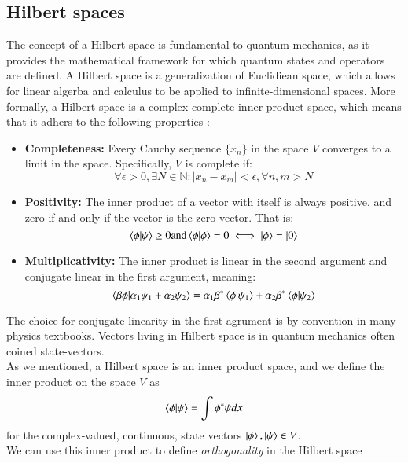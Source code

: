 \documentclass{subfiles}
\begin{document}
\subsection{Hilbert spaces}\label{sec:Hilbert_space}
The concept of a Hilbert space is fundamental to quantum mechanics, as it provides the mathematical framework for which quantum states and operators are defined. A Hilbert space is a generalization of Euclidiean space, which allows for linear algerba and calculus to be applied to infinite-dimensional spaces. More formally, a Hilbert space is a complex complete inner product space, which means that it adhers to the following properties \cite{griffiths2018introduction, berera2021quantum}: 
\begin{itemize}
    \item \textbf{Completeness:} Every Cauchy sequence $\{x_n\}$ in the space $V$ converges to a limit in the space. Specifically, $V$ is complete if:
    \begin{equation}
        \forall \epsilon > 0, \exists N \in \mathbb{N} : |x_n - x_m| < \epsilon, \forall n,m > N
    \end{equation}
    \item \textbf{Positivity:} The inner product of a vector with itself is always positive, and zero if and only if the vector is the zero vector. That is:
    \begin{equation}
        \braket{\phi|\psi}\geq 0 \text{and} \braket{\phi|\phi} = 0 \iff \ket{\phi} = \ket{0} 
    \end{equation}
    \item \textbf{Multiplicativity:} The inner product is linear in the second argument and conjugate linear in the first argument, meaning:
    \begin{equation}
        \braket{\beta\phi|\alpha_1\psi_1 + \alpha_2\psi_2} = \alpha_1\beta^*\braket{\phi|\psi_1} + \alpha_2\beta^*\braket{\phi|\psi_2} 
    \end{equation}
\end{itemize}
The choice for conjugate linearity in the first agrument is by convention in many physics textbooks. Vectors living in Hilbert space is in quantum mechanics often coined state-vectors. \\ As we mentioned, a Hilbert space is an inner product space, and we define the inner product on the space $V$ as
\begin{align*}
    \braket{\phi|\psi} = \int \phi^* \psi dx
\end{align*}
for the complex-valued, continuous, state vectors $\ket{\phi}, \ket{\psi} \in V$. \\ We can use this inner product to define \emph{orthogonality} in the Hilbert space
\end{document}
